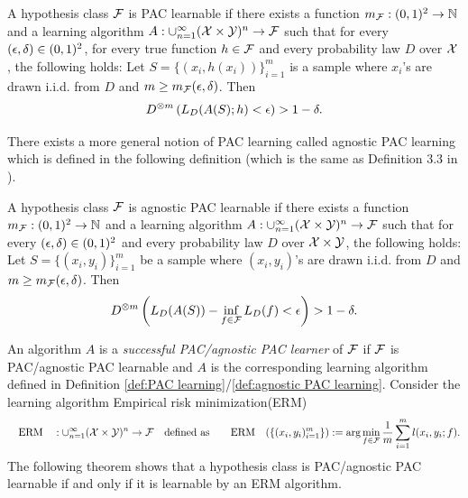 \begin{defn}\label{def:PAC learning}
A hypothesis class $\mathcal{F}$ is PAC learnable if there exists a function $m_{\mathcal{F}}: (0,1)^2 \to \mathbb{N}$ and a learning algorithm $A: \cup_{n=1}^\infty (\mathcal{X} \times \mathcal{Y})^n \to \mathcal{F}$ such that for every $(\epsilon, \delta) \in (0,1)^2$, for every true function $h \in \mathcal{F}$ and every probability law $D$ over $\mathcal{X}$, the following holds:
Let $S = \{(x_i, h(x_i))\}_{i=1}^m$ is a sample where $x_i$'s are drawn i.i.d. from  $D$ and $m \geq m_{\mathcal{F}}(\epsilon,\delta)$. Then
\[
D^{\otimes m}\left( L_{D}(A(S);h)  < \epsilon \right) > 1 - \delta.
\]
\end{defn}
There exists a more general notion of PAC learning called agnostic PAC learning which is defined in the following definition (which is the same as Definition 3.3 in \cite{shalev-shwartz_ben-david_2014}).
\begin{defn}\label{def:agnostic PAC learning}
A hypothesis class $\mathcal{F}$ is agnostic PAC learnable if there exists a function $m_{\mathcal{F}}: (0,1)^2 \to \mathbb{N}$ and a learning algorithm $A: \cup_{n=1}^\infty (\mathcal{X} \times \mathcal{Y})^n \to \mathcal{F}$ such that for every $(\epsilon, \delta) \in (0,1)^2$ and every probability law $D$ over $\mathcal{X} \times \mathcal{Y}$, the following holds: Let $S = \{(x_i, y_i)\}_{i=1}^m$ be a sample where 
$(x_i, y_i)$'s are drawn i.i.d. from  $D$ and 
$m \geq m_{\mathcal{F}}(\epsilon, \delta)$. Then
\[
D^{\otimes m}\left( L_{D}(A(S)) - \inf_{f \in \mathcal{F}} L_{D}(f) < \epsilon \right) > 1 - \delta.
\]
\end{defn}
An algorithm $A$ is a \textit{successful PAC/agnostic PAC learner} of $\mathcal{F}$ if $\mathcal{F}$ is PAC/agnostic PAC learnable and $A$ is the corresponding learning algorithm defined in Definition \ref{def:PAC learning}/\ref{def:agnostic PAC learning}. Consider the learning algorithm Empirical risk minimization(ERM) 
\[\hbox{\quad ERM\quad}:\cup_{n=1}^\infty(\mathcal{X}\times \mathcal{Y})^n \rightarrow \mathcal{F} \hbox{\quad defined as\quad} 
\hbox{\quad ERM\quad}(\{(x_i, y_i)_{i=1}^m\}) := \arg\min_{f \in \mathcal{F}} \frac{1}{m} \sum_{i=1}^m l(x_i, y_i; f).
\]
The following theorem shows that a hypothesis class is PAC/agnostic PAC learnable if and only if it is learnable by an ERM algorithm.

